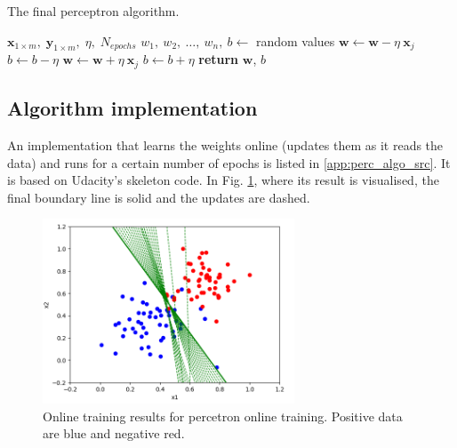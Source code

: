\documentclass[a4paper]{article}
\begin{document}
\begin{algorithm}[H]
\caption{The final perceptron algorithm.}
\begin{algorithmic}[1]
 {$\textbf{x}_{1\times m},\;\textbf{y}_{1\times m},\; \eta, \; N_{epochs}$}
\State {}
\State {}
\State $w_1,\ w_2, \ \ldots, \ w_n,\ b \leftarrow$ random values
 
\State $\textbf{w} \leftarrow \textbf{w} - \eta \ \textbf{x}_j$
\State $b \leftarrow b - \eta$
 
\State $\textbf{w} \leftarrow \textbf{w} + \eta \ \textbf{x}_j$
\State $b \leftarrow b + \eta$
\EndIf
\EndFor
\EndFor
\State \textbf{return} $\textbf{w}$, $b$
\EndProcedure
\end{algorithmic}
\end{algorithm}


\subsection{Algorithm implementation}

An implementation that learns the weights online (updates them as it reads the data) and runs for a certain number of epochs is listed in \ref{app:perc_algo_src}. It is based on Udacity's skeleton code. In Fig. \ref{fig:perc_training_out}, where its result is visualised, the final boundary line is solid and the updates are dashed.
\begin{figure}[H]
    \centering
    \includegraphics[height=5.5cm]{img/algo_training_out.PNG}
    \caption{Online training results for percetron online training. Positive data are blue and negative red.}
    \label{fig:perc_training_out}
\end{figure}
\end{document}
